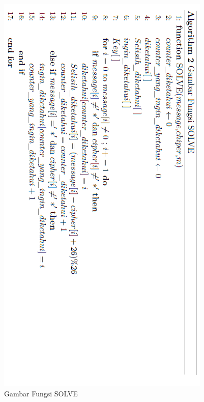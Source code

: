   \begin{figure}[H]
		\centering
		\includegraphics[scale=0.62]{images/bab3/solvefx1.png}
		\caption{Gambar Fungsi SOLVE}
		\label{fig:solvefx}
	\end{figure}
